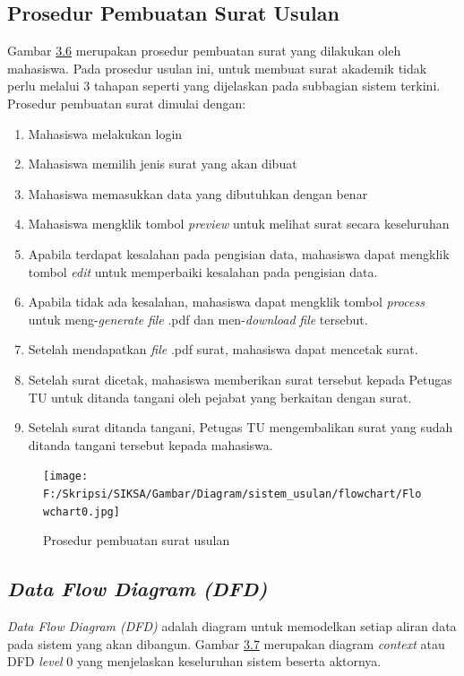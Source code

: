 \subsection{Prosedur Pembuatan Surat Usulan}
\label{sec:pembuatan_surat_usulan}
Gambar \hyperlink{pembuatan_usulan}{3.6} merupakan prosedur pembuatan surat yang dilakukan oleh mahasiswa. Pada prosedur usulan ini, untuk membuat surat akademik tidak perlu melalui 3 tahapan seperti yang dijelaskan pada subbagian sistem terkini. Prosedur pembuatan surat dimulai dengan:
\begin{enumerate}
	\item Mahasiswa melakukan login
	\item Mahasiswa memilih jenis surat yang akan dibuat
	\item Mahasiswa memasukkan data yang dibutuhkan dengan benar
	\item Mahasiswa mengklik tombol \textit{preview} untuk melihat surat secara keseluruhan
	\item Apabila terdapat kesalahan pada pengisian data, mahasiswa dapat mengklik tombol \textit{edit} untuk memperbaiki kesalahan pada pengisian data.
	\item Apabila tidak ada kesalahan, mahasiswa dapat mengklik tombol \textit{process} untuk meng-\textit{generate} \textit{file} .pdf dan men-\textit{download} \textit{file} tersebut.
	\item Setelah mendapatkan \textit{file} .pdf surat, mahasiswa dapat mencetak surat.
	\item Setelah surat dicetak, mahasiswa memberikan surat tersebut kepada Petugas TU untuk ditanda tangani oleh pejabat yang berkaitan dengan surat.
	\item Setelah surat ditanda tangani, Petugas TU mengembalikan surat yang sudah ditanda tangani tersebut kepada mahasiswa.
	\
\end{enumerate}
\begin{figure}[H]
	\centering
		\texttt{[image: F:/Skripsi/SIKSA/Gambar/Diagram/sistem\_usulan/flowchart/Flowchart0.jpg]}
	{\caption{Prosedur pembuatan surat usulan}}
	\label{fig:pembuatan_usulan}
\end{figure}

\subsection{\textit{Data Flow Diagram (DFD)}}
\label{sec:data_flow_diagram}
\textit{Data Flow Diagram (DFD)} adalah diagram untuk memodelkan setiap aliran data pada sistem yang akan dibangun.
Gambar \hyperlink{data_flow}{3.7} merupakan diagram \textit{context} atau DFD \textit{level} 0 yang menjelaskan 
keseluruhan sistem beserta aktornya.


